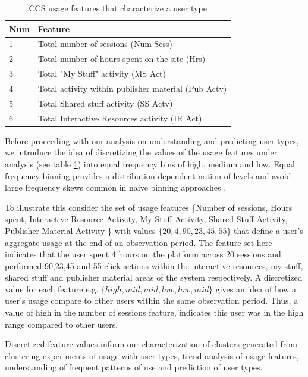 \documentclass{acm_proc_article-sp}
\begin{document}
\begin{table}

\centering
\caption{CCS usage features that characterize a user type}
\label{usagefeatures}
\begin{tabular}{|l|l|} 
\hline
Num & Feature \\ \hline
1 & Total number of sessions (Num Sess) \\ \hline
2 & Total number of hours spent on the site (Hrs) \\ \hline
3 & Total "My Stuff" activity (MS Act) \\ \hline
4 & Total activity within publisher material (Pub Actv)\\ \hline
5 & Total Shared stuff activity (SS Actv) \\ \hline
6 & Total Interactive Resources activity (IR Act)	\\ \hline
\end{tabular}
\end{table}
Before proceeding with our analysis on understanding and predicting user types, we introduce the idea of discretizing the values of the usage features under analysis (see table \ref{usagefeatures}) into equal frequency bins of high, medium and low. Equal frequency binning provides a distribution-dependent notion of levels and avoid large frequency skews common in naive binning approaches \cite{han2006data}.

 To illustrate this consider the set of usage features \{Number of sessions, Hours spent, Interactive Resource Activity, My Stuff Activity, Shared Stuff Activity, Publisher Material Activity \} with values $\{20,4,90,23,45,55 \}$ that define a user's aggregate usage at the end of an observation period. The feature set here indicates that the user spent 4 hours on the platform across 20 sessions and performed 90,23,45 and 55 click actions within the interactive resources, my stuff, shared stuff and publisher material areas of the system respectively. A discretized value for each feature e.g. $\{high,mid,mid,low,low, mid\}$ gives an idea of how a user's usage compare to other users within the same observation period. Thus, a value of high in the number of sessions feature, indicates this user was in the high range compared to other users.
 
 Discretized feature values inform our characterization of clusters generated from  clustering experiments of usage  with user types, trend analysis of usage features, understanding of frequent patterns of use and prediction of user types. 
 
\end{document}
